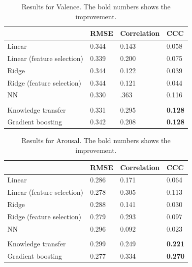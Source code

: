 \documentclass{article}
\begin{document}
\begin{table}[h]
\centering
\begin{tabular}{|l|l|l|l|}
\hline
						& RMSE		& Correlation 	& CCC 	 \\ \hline
Linear 					& 0.344		& 0.143		& 0.058  \\ \hline	
Linear (feature selection)		& 0.339		& 0.200 		& 0.075	 \\ \hline
Ridge					& 0.344 		& 0.122		& 0.039	 \\ \hline
Ridge (feature selection)		& 0.344		& 0.121		& 0.044	 \\ \hline
NN						& 0.330		& .363		& 0.116 \\ \hline
& & & \\ \hline
Knowledge transfer 		& 0.331		& 0.295		& \textbf{0.128}	 \\ \hline
Gradient boosting 			& 0.342 		& 0.208 		& \textbf{0.128}  \\ \hline
\end{tabular}
\caption{Results for Valence. The bold numbers shows the improvement.}
\label{Valence_table}
\end{table}

\begin{table}[h]
\centering
\begin{tabular}{|l|l|l|l|}
\hline
						& RMSE		& Correlation 	& CCC 	 \\ \hline
Linear					& 0.286		& 0.171		& 0.064  \\ \hline	
Linear (feature selection)		& 0.278		& 0.305 		& 0.113	 \\ \hline
Ridge					& 0.288  		& 0.141		& 0.030	 \\ \hline
Ridge (feature selection)		& 0.279		& 0.293		& 0.097	 \\ \hline
NN						& 0.296		& 0.092		& 0.023 \\ \hline
& & & \\ \hline
Knowledge transfer 		& 0.299		& 0.249 		& \textbf{0.221}	 \\ \hline
Gradient boosting 			& 0.277 		& 0.334 		& \textbf{0.270}  \\ \hline
\end{tabular}
\caption{Results for Arousal. The bold numbers shows the improvement.}
\label{Arousal_table}
\end{table}
\end{document}
